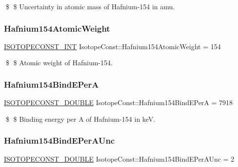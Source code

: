 \$ \$ Uncertainty in atomic mass of Hafnium-\/154 in amu. \mbox{\label{group___isotope_const-_hafnium-_hf154_gadc69edaf5f96bbb0a3d1bb0a7e9c4a2d}} 
\subsubsection{\texorpdfstring{Hafnium154\+Atomic\+Weight}{Hafnium154AtomicWeight}}
{\footnotesize\ttfamily \mbox{\hyperlink{group___isotope_const-_macros_ga5f18360b3e99483a35c32d789e62621c}{I\+S\+O\+T\+O\+P\+E\+C\+O\+N\+S\+T\+\_\+\+I\+NT}} Isotope\+Const\+::\+Hafnium154\+Atomic\+Weight = 154}

\$ \$ Atomic weight of Hafnium-\/154. \mbox{\label{group___isotope_const-_hafnium-_hf154_ga6d40dbd067dd280973486fd41ba42fe4}} 
\subsubsection{\texorpdfstring{Hafnium154\+Bind\+E\+PerA}{Hafnium154BindEPerA}}
{\footnotesize\ttfamily \mbox{\hyperlink{group___isotope_const-_macros_ga8f45a7272ce02c0b4c65c44636ed719a}{I\+S\+O\+T\+O\+P\+E\+C\+O\+N\+S\+T\+\_\+\+D\+O\+U\+B\+LE}} Isotope\+Const\+::\+Hafnium154\+Bind\+E\+PerA = 7918}

\$ \$ Binding energy per A of Hafnium-\/154 in keV. \mbox{\label{group___isotope_const-_hafnium-_hf154_ga09441e9f939546248adad660437c17f9}} 
\subsubsection{\texorpdfstring{Hafnium154\+Bind\+E\+Per\+A\+Unc}{Hafnium154BindEPerAUnc}}
{\footnotesize\ttfamily \mbox{\hyperlink{group___isotope_const-_macros_ga8f45a7272ce02c0b4c65c44636ed719a}{I\+S\+O\+T\+O\+P\+E\+C\+O\+N\+S\+T\+\_\+\+D\+O\+U\+B\+LE}} Isotope\+Const\+::\+Hafnium154\+Bind\+E\+Per\+A\+Unc = 2}

